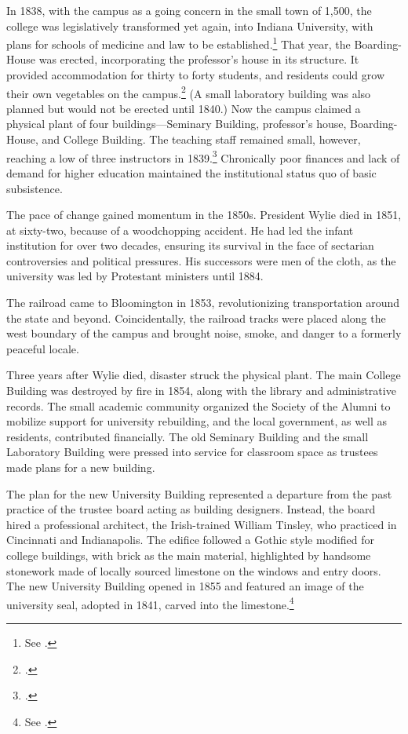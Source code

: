 \documentclass[
  american,
  letterpaper,
]{scrreprt}
\begin{document}
In 1838, with the campus as a going concern in the small town of 1,500,
the college was legislatively transformed yet again, into Indiana
University, with plans for schools of medicine and law to be
established.\footnote{See .} That year, the
Boarding-House was erected, incorporating the professor's house in its
structure. It provided accommodation for thirty to forty students, and
residents could grow their own vegetables on the campus.\footnote{.} (A small laboratory building was also planned but would
not be erected until 1840.) Now the campus claimed a physical plant of
four buildings---Seminary Building, professor's house, Boarding-House,
and College Building. The teaching staff remained small, however,
reaching a low of three instructors in 1839.\footnote{.} Chronically poor
finances and lack of demand for higher education maintained the
institutional status quo of basic subsistence.

The pace of change gained momentum in the 1850s. President Wylie died in
1851, at sixty-two, because of a woodchopping accident. He had led the
infant institution for over two decades, ensuring its survival in the
face of sectarian controversies and political pressures. His successors
were men of the cloth, as the university was led by Protestant ministers
until 1884.

The railroad came to Bloomington in 1853, revolutionizing transportation
around the state and beyond. Coincidentally, the railroad tracks were
placed along the west boundary of the campus and brought noise, smoke,
and danger to a formerly peaceful locale.

Three years after Wylie died, disaster struck the physical plant. The
main College Building was destroyed by fire in 1854, along with the
library and administrative records. The small academic community
organized the Society of the Alumni to mobilize support for university
rebuilding, and the local government, as well as residents, contributed
financially. The old Seminary Building and the small Laboratory Building
were pressed into service for classroom space as trustees made plans for
a new building.

The plan for the new University Building represented a departure from
the past practice of the trustee board acting as building designers.
Instead, the board hired a professional architect, the Irish-trained
William Tinsley, who practiced in Cincinnati and Indianapolis. The
edifice followed a Gothic style modified for college buildings, with
brick as the main material, highlighted by handsome stonework made of
locally sourced limestone on the windows and entry doors. The new
University Building opened in 1855 and featured an image of the
university seal, adopted in 1841, carved into the limestone.\footnote{See
  .}
\end{document}
